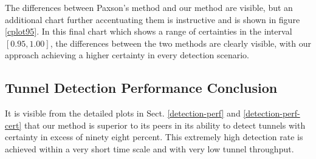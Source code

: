 \documentclass{llncs}
\begin{document}

The differences between Paxson's method and our method are visible,
but an additional chart further accentuating them is instructive and
is shown in figure \ref{cplot95}. In this final chart which shows a
range of certainties in the interval $[0.95,1.00]$, the differences
between the two methods are clearly visible, with our approach
achieving a higher certainty in every detection scenario.

\subsection{Tunnel Detection Performance Conclusion}
It is visible from the detailed plots in Sect. \ref{detection-perf}
and \ref{detection-perf-cert} that our method is superior to its peers
in its ability to detect tunnels with certainty in excess of ninety
eight percent.  This extremely high detection rate is achieved within
a very short time scale and with very low tunnel throughput.
\end{document}
